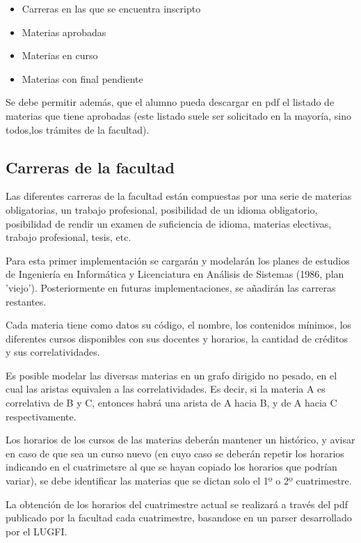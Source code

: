 \documentclass[a4paper]{article}
\begin{document}
\begin{itemize}
	\item Carreras en las que se encuentra inscripto
	\item Materias aprobadas
	\item Materias en curso
	\item Materias con final pendiente
\end{itemize}

Se debe permitir además, que el alumno pueda descargar en pdf el listado de materias que tiene aprobadas (este listado suele ser solicitado en la mayoría, sino todos,los trámites de la facultad).

\subsection{Carreras de la facultad}

Las diferentes carreras de la facultad están compuestas por una serie de materias obligatorias, un trabajo profesional, posibilidad de un idioma obligatorio, posibilidad de rendir un examen de suficiencia de idioma, materias electivas, trabajo profesional, tesis, etc.

Para esta primer implementación se cargarán y modelarán los planes de estudios de Ingeniería en Informática y Licenciatura en Análisis de Sistemas (1986, plan 'viejo'). Posteriormente en futuras implementaciones, se añadirán las carreras restantes.

Cada materia tiene como datos su código, el nombre, los contenidos mínimos, los diferentes cursos disponibles con sus docentes y horarios, la cantidad de créditos y sus correlatividades.

Es posible modelar las diversas materias en un grafo dirigido no pesado, en el cual las aristas equivalen a las correlatividades. Es decir, si la materia A es correlativa de B y C, entonces habrá una arista de A hacia B, y de A hacia C respectivamente.\newline


Los horarios de los cursos de las materias deberán mantener un histórico, y avisar en caso de que sea un curso nuevo (en cuyo caso se deberán repetir los horarios indicando en el cuatrimetsre al que se hayan copiado los horarios que podrían variar), se debe identificar las materias que se dictan solo el 1º o 2º cuatrimestre.

La obtención de los horarios del cuatrimestre actual se realizará a través del pdf publicado por la facultad cada cuatrimestre, basandose en un parser desarrollado por el LUGFI\cite{PARSER_LUGFI}.
\end{document}
